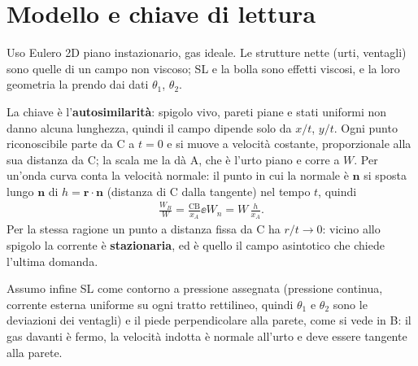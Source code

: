 \section*{Modello e chiave di lettura}
Uso Eulero 2D piano instazionario, gas ideale. Le strutture nette (urti, ventagli) sono quelle di un campo non
viscoso; SL e la bolla sono effetti viscosi, e la loro geometria la prendo dai dati $\theta_1$, $\theta_2$.

La chiave è l'\textbf{autosimilarità}: spigolo vivo, pareti piane e stati uniformi non danno alcuna lunghezza, quindi
il campo dipende solo da $x/t$, $y/t$. Ogni punto riconoscibile parte da C a $t=0$ e si muove a velocità costante,
proporzionale alla sua distanza da C; la scala me la dà A, che è l'urto piano e corre a $W$. Per un'onda curva conta la
velocità normale: il punto in cui la normale è $\mathbf n$ si sposta lungo $\mathbf n$ di $h=\mathbf r\cdot\mathbf n$
(distanza di C dalla tangente) nel tempo $t$, quindi
\begin{gather*}
  \frac{W_B}{W}=\frac{\mathrm{CB}}{x_A} \ee W_n=W\,\frac{h}{x_A}.
\end{gather*}
Per la stessa ragione un punto a distanza fissa da C ha $r/t\to0$: vicino allo spigolo la corrente è
\textbf{stazionaria}, ed è quello il campo asintotico che chiede l'ultima domanda.

Assumo infine SL come contorno a pressione assegnata (pressione continua, corrente esterna uniforme su ogni tratto
rettilineo, quindi $\theta_1$ e $\theta_2$ sono le deviazioni dei ventagli) e il piede perpendicolare alla parete,
come si vede in B: il gas davanti è fermo, la velocità indotta è normale all'urto e deve essere tangente alla parete.

